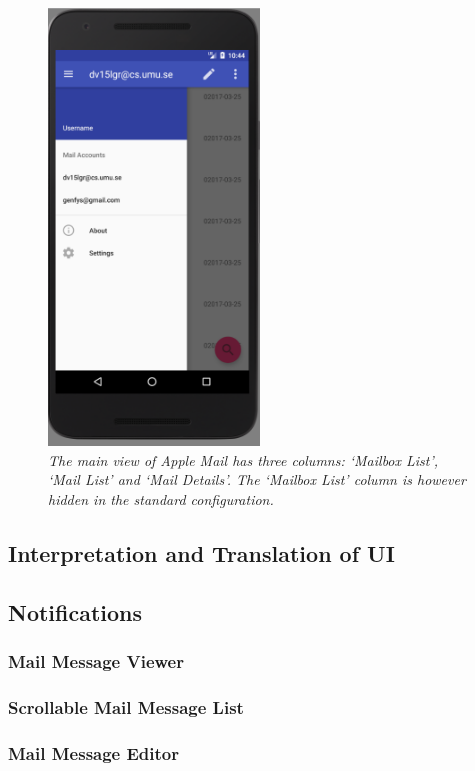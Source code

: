 \documentclass[a4paper,11pt,twoside]{article}
\begin{document}
\begin{figure}
  \label{fig:nav_drawer}
  \centering
    \includegraphics[width=0.5\textwidth]{nav_drawer}
    \caption{\textit{The main view of Apple Mail has three columns: `Mailbox List',
    `Mail List' and `Mail Details'. The `Mailbox List' column is however
    hidden in the standard configuration.}}
\end{figure}






\subsection{Interpretation and Translation of UI}
\subsection{Notifications}
\subsubsection{Mail Message Viewer}
\subsubsection{Scrollable Mail Message List}
\subsubsection{Mail Message Editor}
\end{document}
